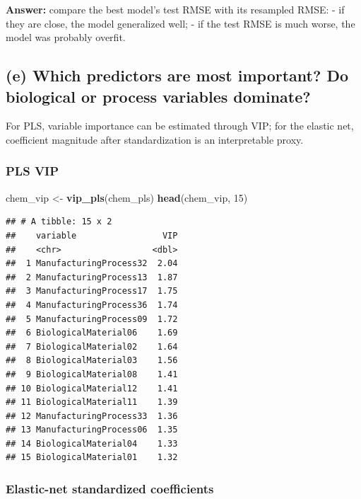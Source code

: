 \documentclass[
  11pt,
]{article}
\newenvironment{Shaded}{\begin{snugshade}}{\end{snugshade}}
\newcommand{\DecValTok}[1]{\textcolor[rgb]{0.00,0.00,0.81}{#1}}
\newcommand{\FunctionTok}[1]{\textcolor[rgb]{0.13,0.29,0.53}{\textbf{#1}}}
\newcommand{\NormalTok}[1]{#1}
\newcommand{\OtherTok}[1]{\textcolor[rgb]{0.56,0.35,0.01}{#1}}
\begin{document}
\textbf{Answer:} compare the best model's test RMSE with its resampled
RMSE: - if they are close, the model generalized well; - if the test
RMSE is much worse, the model was probably overfit.

\subsection{(e) Which predictors are most important? Do biological or
process variables
dominate?}\label{e-which-predictors-are-most-important-do-biological-or-process-variables-dominate}

For PLS, variable importance can be estimated through VIP; for the
elastic net, coefficient magnitude after standardization is an
interpretable proxy.

\subsubsection{PLS VIP}\label{pls-vip}

\begin{Shaded}
\begin{Highlighting}[]
\NormalTok{chem\_vip }\OtherTok{\textless{}{-}} \FunctionTok{vip\_pls}\NormalTok{(chem\_pls)}
\FunctionTok{head}\NormalTok{(chem\_vip, }\DecValTok{15}\NormalTok{)}
\end{Highlighting}
\end{Shaded}

\begin{verbatim}
## # A tibble: 15 x 2
##    variable                 VIP
##    <chr>                  <dbl>
##  1 ManufacturingProcess32  2.04
##  2 ManufacturingProcess13  1.87
##  3 ManufacturingProcess17  1.75
##  4 ManufacturingProcess36  1.74
##  5 ManufacturingProcess09  1.72
##  6 BiologicalMaterial06    1.69
##  7 BiologicalMaterial02    1.64
##  8 BiologicalMaterial03    1.56
##  9 BiologicalMaterial08    1.41
## 10 BiologicalMaterial12    1.41
## 11 BiologicalMaterial11    1.39
## 12 ManufacturingProcess33  1.36
## 13 ManufacturingProcess06  1.35
## 14 BiologicalMaterial04    1.33
## 15 BiologicalMaterial01    1.32
\end{verbatim}

\subsubsection{Elastic-net standardized
coefficients}\label{elastic-net-standardized-coefficients}
\end{document}
